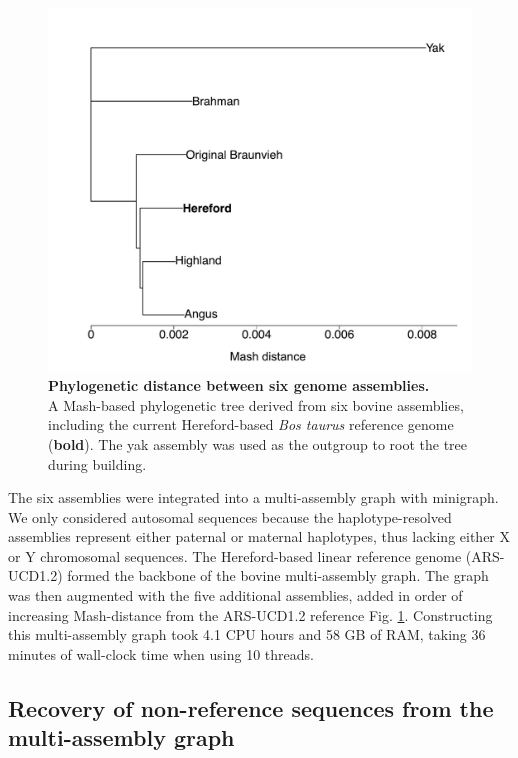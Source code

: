 \documentclass[../main.tex]{subfiles}
\begin{document}
\begin{figure}[!htb]
    \centering
    \includegraphics[width=\textwidth]{paper3/main_figure/Fig1.pdf}
        \caption[Phylogenetic distance between six genome assemblies]{\textbf{Phylogenetic distance between six genome assemblies.} \\
        \footnotesize{A Mash-based phylogenetic tree derived from six bovine assemblies, including the current Hereford-based \emph{Bos taurus} reference genome (\textbf{bold}). The yak assembly was used as the outgroup to root the tree during building.}}
        \label{fig41:phylo}
\end{figure}


The six assemblies were integrated into a multi-assembly graph with minigraph. We only considered autosomal sequences because the haplotype-resolved assemblies represent either paternal or maternal haplotypes, thus lacking either X or Y chromosomal sequences. The Hereford-based linear reference genome (ARS-UCD1.2) formed the backbone of the bovine multi-assembly graph. The graph was then augmented with the five additional assemblies, added in order of increasing Mash-distance from the ARS-UCD1.2 reference \citep{ondov2016mash} Fig. \ref{fig41:phylo}. Constructing this multi-assembly graph took 4.1 CPU hours and 58 GB of RAM, taking 36 minutes of wall-clock time when using 10 threads.

\subsection*{Recovery of non-reference sequences from the multi-assembly graph}
\end{document}
